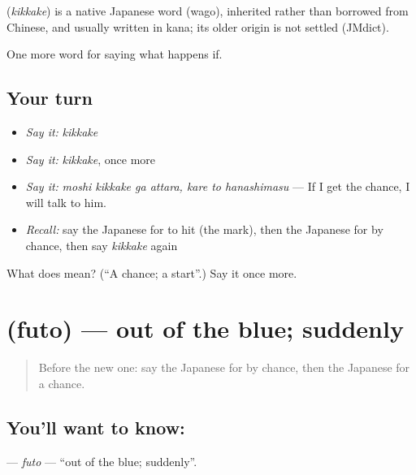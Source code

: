 \begin{cousinweb}
\textbf{} (\emph{kikkake}) is a native Japanese word (wago), inherited rather than borrowed from Chinese, and usually written in kana; its older origin is not settled (JMdict).
\end{cousinweb}

\begin{grammarlens}[title={What you've built}]
One more word for saying what happens if.
\end{grammarlens}

\subsection*{Your turn}
\begin{itemize}
\raggedright
  \item \emph{Say it:} \emph{kikkake}
  \item \emph{Say it:} \emph{kikkake}, once more
  \item \emph{Say it:} \emph{moshi kikkake ga attara, kare to hanashimasu} — If I get the chance, I will talk to him.
  \item \emph{Recall:} say the Japanese for to hit (the mark), then the Japanese for by chance, then say \emph{kikkake} again
\end{itemize}

\begin{tcolorbox}[breakable,colback=teal!4,colframe=teal!35!black,title={Before you move on}]
What does  mean? (\textquotedblleft{}A chance; a start\textquotedblright{}.) Say it once more.
\end{tcolorbox}
\section[\texorpdfstring{\ja{ふと} (futo)}{ふと (futo)}]{ (futo) — out of the blue; suddenly}

\label{lesson:JA-C510-futo}



\begin{quote}
Before the new one: say the Japanese for by chance, then the Japanese for a chance.
\end{quote}

\subsection*{You'll want to know: }
\textbf{} — \emph{futo} — \textquotedblleft{}out of the blue; suddenly\textquotedblright{}.

